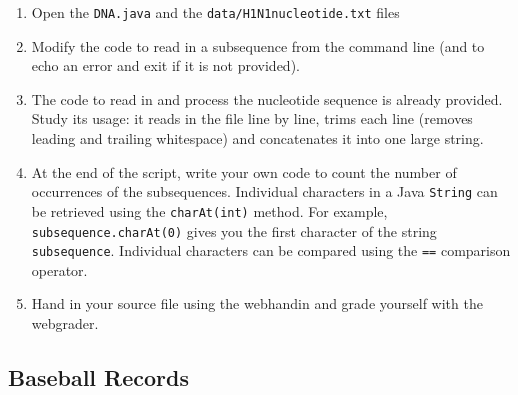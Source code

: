 \documentclass[12pt]{scrartcl}
\begin{document}
\begin{enumerate}
  \item Open the \texttt{DNA.java} and the 
  	\texttt{data/H1N1nucleotide.txt} files
  \item Modify the code to read in a subsequence from the command 
  	line (and to echo an error and exit if it is not provided).
  \item The code to read in and process the nucleotide sequence is 
	already provided.  Study its usage: it reads in the file line by 
	line, trims each line (removes leading and trailing whitespace) and 
	concatenates it into one large string.
  \item At the end of the script, write your own code to count the
	number of occurrences of the subsequences.  Individual characters
	in a Java \texttt{String} can be retrieved using the
	\texttt{charAt(int)} method.  For example, 
	\texttt{subsequence.charAt(0)} gives you the first 
	character of the string \texttt{subsequence}. 
	Individual characters can be compared using the \texttt{==}
	comparison operator.
  \item Hand in your source file using the webhandin and grade yourself 
	with the webgrader.
\end{enumerate}
	
\subsection*{Baseball Records}
\end{document}
